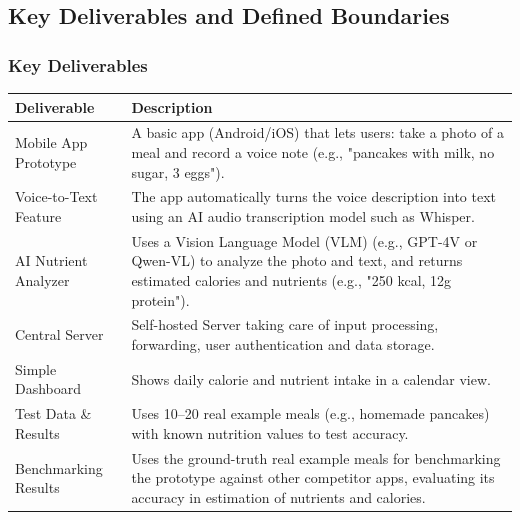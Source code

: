\documentclass[11pt,a4paper]{article}
\begin{document}
\subsection{Key Deliverables and Defined Boundaries}

\subsubsection{Key Deliverables}

\noindent
\begin{minipage}{\textwidth}
    \centering
    \label{tab:deliverables}
    \small
    \begin{tabularx}{\textwidth}{l X}
        \toprule
        \textbf{Deliverable} & \textbf{Description} \\
        \midrule
        Mobile App Prototype & A basic app (Android/iOS) that lets users: take a photo of a meal and record a voice note (e.g., "pancakes with milk, no sugar, 3 eggs"). \\
        \addlinespace[10pt]
        Voice-to-Text Feature & The app automatically turns the voice description into text using an AI audio transcription model such as Whisper. \\
        \addlinespace[10pt]
        AI Nutrient Analyzer & Uses a Vision Language Model (VLM) (e.g., GPT-4V or Qwen-VL) to analyze the photo and text, and returns estimated calories and nutrients (e.g., "250 kcal, 12g protein"). \\
        \addlinespace[10pt]
        Central Server & Self-hosted Server taking care of input processing, forwarding, user authentication and data storage.  \\
        \addlinespace[10pt]
        Simple Dashboard & Shows daily calorie and nutrient intake in a calendar view. \\
        \addlinespace[10pt]
        Test Data \& Results & Uses 10–20 real example meals (e.g., homemade pancakes) with known nutrition values to test accuracy. \\
        \addlinespace[10pt]
        Benchmarking Results & Uses the ground-truth real example meals for benchmarking the prototype against other competitor apps, evaluating its accuracy in estimation of nutrients and calories. \\
        \bottomrule
    \end{tabularx}

\end{minipage}
\end{document}
